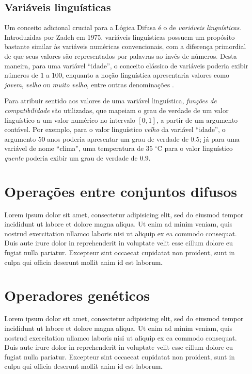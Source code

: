 \documentclass[12pt]{article}
\begin{document}
\subsection{Variáveis linguísticas}

Um conceito adicional crucial para a Lógica Difusa é o de \textit{variáveis linguísticas}. Introduzidas por Zadeh em 1975, variáveis linguísticas possuem um propósito bastante similar às variáveis numéricas convencionais, com a diferença primordial de que seus valores são representados por palavras ao invés de números. Desta maneira, para uma variável ``idade'', o conceito clássico de variáveis poderia exibir números de 1 a 100, enquanto a noção linguística apresentaria valores como \textit{jovem}, \textit{velho} ou \textit{muito velho}, entre outras denominações \cite{Zadeh1975}.

Para atribuir sentido aos valores de uma variável linguística, \textit{funções de compatibilidade} são utilizadas, que mapeiam o grau de verdade de um valor linguístico a um valor numérico no intervalo $[0, 1]$, a partir de um argumento contável. Por exemplo, para o valor linguístico \textit{velho} da variável ``idade'', o argumento 50 anos poderia apresentar um grau de verdade de $0.5$; já para uma variável de nome ``clima'', uma temperatura de 35 $^{\circ}$C para o valor linguístico \textit{quente} poderia exibir um grau de verdade de $0.9$.

\section{Operações entre conjuntos difusos} \label{sec:operations}

Lorem ipsum dolor sit amet, consectetur adipisicing elit, sed do eiusmod tempor incididunt ut labore et dolore magna aliqua. Ut enim ad minim veniam, quis nostrud exercitation ullamco laboris nisi ut aliquip ex ea commodo consequat. Duis aute irure dolor in reprehenderit in voluptate velit esse cillum dolore eu fugiat nulla pariatur. Excepteur sint occaecat cupidatat non proident, sunt in culpa qui officia deserunt mollit anim id est laborum.

\section{Operadores genéticos} \label{sec:operators}

Lorem ipsum dolor sit amet, consectetur adipisicing elit, sed do eiusmod tempor incididunt ut labore et dolore magna aliqua. Ut enim ad minim veniam, quis nostrud exercitation ullamco laboris nisi ut aliquip ex ea commodo consequat. Duis aute irure dolor in reprehenderit in voluptate velit esse cillum dolore eu fugiat nulla pariatur. Excepteur sint occaecat cupidatat non proident, sunt in culpa qui officia deserunt mollit anim id est laborum.
\end{document}
